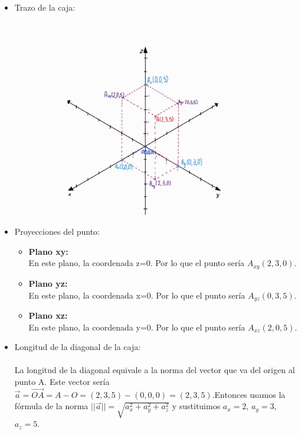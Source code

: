\documentclass[12pt]{article}
\begin{document}
\begin{itemize}
\item Trazo de la caja:
   \begin{figure}[H]
       \centering
       \includegraphics[width=1\textwidth]{./img/caja.jpeg}
  \end{figure}
\item Proyecciones del punto:
  \begin{itemize}
  \item \textbf{Plano xy:} \\
  En este plano, la coordenada z=0. Por lo que el punto sería $A_{xy}(2, 3, 0)$.
\item \textbf{Plano yz:} \\
  En este plano, la coordenada x=0. Por lo que el punto sería $A_{yz}(0, 3, 5)$.
\item \textbf{Plano xz:} \\
  En este plano, la coordenada y=0. Por lo que el punto sería $A_{xz}(2, 0, 5)$.
  \end{itemize}
\item Longitud de la diagonal de la caja: \\ \\
La longitud de la diagonal equivale a la norma del vector que va del origen al punto A. Este vector sería $\vec{a} = \vec{OA} = A-O = (2, 3, 5) - (0, 0, 0) = (2,3,5)$.Entonces usamos la fórmula de la norma $||\vec{a}|| = \sqrt{a_x^2 +  a_y^2 + a_z^2}$ y sustituimos $a_x = 2$, $a_y = 3$, $a_z = 5$. \\
\begin{equation*}

\end{equation*}
\end{itemize}
\end{document}
